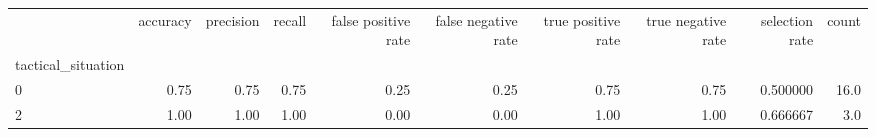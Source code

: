 \begin{tabular}{lrrrrrrrrr}
\toprule
{} &  accuracy &  precision &  recall &  false positive rate &  false negative rate &  true positive rate &  true negative rate &  selection rate &  count \\
tactical\_situation &           &            &         &                      &                      &                     &                     &                 &        \\
\midrule
0                  &      0.75 &       0.75 &    0.75 &                 0.25 &                 0.25 &                0.75 &                0.75 &        0.500000 &   16.0 \\
2                  &      1.00 &       1.00 &    1.00 &                 0.00 &                 0.00 &                1.00 &                1.00 &        0.666667 &    3.0 \\
\bottomrule
\end{tabular}
